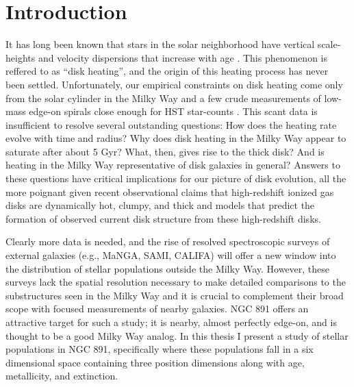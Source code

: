 \chapter[Introduction]{Introduction}
\label{chap:intro}


\clearpage It has long been known that stars in the solar neighborhood
have vertical scale-heights and velocity dispersions that increase
with age \citep[e.g.,][]{Wielen74}. This phenomenon is reffered to as
``disk heating'', and the origin of this heating process has never
been settled. Unfortunately, our empirical constraints on disk heating
come only from the solar cylinder in the Milky Way and a few crude
measurements of low-mass edge-on spirals close enough for HST
star-counts \citep{Seth05a}. This scant data is insufficient to
resolve several outstanding questions: How does the heating rate
evolve with time and radius?  Why does disk heating in the Milky Way
appear to saturate after about 5 Gyr?  What, then, gives rise to the
thick disk?  And is heating in the Milky Way representative of disk
galaxies in general? Answers to these questions have critical
implications for our picture of disk evolution, all the more poignant
given recent observational claims that high-redshift ionized gas disks
are dynamically hot, clumpy, and thick \citep{Forster-Schreiber09} and
models \citep{Bird13} that predict the formation of observed current
disk structure from these high-redshift disks.

Clearly more data is needed, and the rise of resolved spectroscopic
surveys of external galaxies (e.g., MaNGA, SAMI, CALIFA) will offer a
new window into the distribution of stellar populations outside the
Milky Way. However, these surveys lack the spatial resolution
necessary to make detailed comparisons to the substructures seen in
the Milky Way and it is crucial to complement their broad scope with
focused measurements of nearby galaxies. NGC 891 offers an attractive
target for such a study; it is nearby, almost perfectly edge-on, and
is thought to be a good Milky Way analog. In this thesis I present a
study of stellar populations in NGC 891, specifically where these
populations fall in a six dimensional space containing three position
dimensions along with age, metallicity, and extinction.

